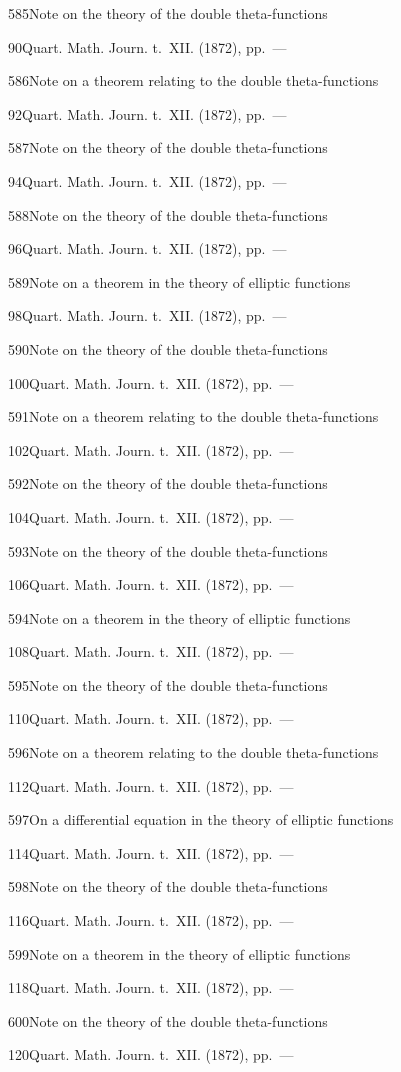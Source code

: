 \documentclass[11pt,a4paper]{book}
\providecommand{\tocentry}[2]{#1\dotfill #2\par}
\begin{document}
\tocentry{585}{Note on the theory of the double theta-functions}{90}{Quart. Math. Journ. t.~XII. (1872), pp.~---}

\tocentry{586}{Note on a theorem relating to the double theta-functions}{92}{Quart. Math. Journ. t.~XII. (1872), pp.~---}

\tocentry{587}{Note on the theory of the double theta-functions}{94}{Quart. Math. Journ. t.~XII. (1872), pp.~---}

\newpage

\tocentry{588}{Note on the theory of the double theta-functions}{96}{Quart. Math. Journ. t.~XII. (1872), pp.~---}

\tocentry{589}{Note on a theorem in the theory of elliptic functions}{98}{Quart. Math. Journ. t.~XII. (1872), pp.~---}

\tocentry{590}{Note on the theory of the double theta-functions}{100}{Quart. Math. Journ. t.~XII. (1872), pp.~---}

\tocentry{591}{Note on a theorem relating to the double theta-functions}{102}{Quart. Math. Journ. t.~XII. (1872), pp.~---}

\tocentry{592}{Note on the theory of the double theta-functions}{104}{Quart. Math. Journ. t.~XII. (1872), pp.~---}

\tocentry{593}{Note on the theory of the double theta-functions}{106}{Quart. Math. Journ. t.~XII. (1872), pp.~---}

\tocentry{594}{Note on a theorem in the theory of elliptic functions}{108}{Quart. Math. Journ. t.~XII. (1872), pp.~---}

\tocentry{595}{Note on the theory of the double theta-functions}{110}{Quart. Math. Journ. t.~XII. (1872), pp.~---}

\tocentry{596}{Note on a theorem relating to the double theta-functions}{112}{Quart. Math. Journ. t.~XII. (1872), pp.~---}

\tocentry{597}{On a differential equation in the theory of elliptic functions}{114}{Quart. Math. Journ. t.~XII. (1872), pp.~---}

\tocentry{598}{Note on the theory of the double theta-functions}{116}{Quart. Math. Journ. t.~XII. (1872), pp.~---}

\tocentry{599}{Note on a theorem in the theory of elliptic functions}{118}{Quart. Math. Journ. t.~XII. (1872), pp.~---}

\tocentry{600}{Note on the theory of the double theta-functions}{120}{Quart. Math. Journ. t.~XII. (1872), pp.~---}

\newpage
\end{document}
